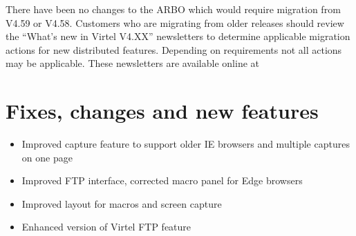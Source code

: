 \documentclass[letterpaper,10pt,english]{sphinxmanual}
\begin{document}

There have been no changes to the ARBO which would require migration from V4.59 or V4.58. Customers who are migrating from older releases should review the
“What’s new in Virtel V4.XX” newsletters to determine applicable migration actions for new distributed features.
Depending on requirements not all actions may be applicable. These newsletters are available online at 


\chapter{Fixes, changes and new features}
\label{\detokenize{Getting_Started:fixes-changes-and-new-features}}
\begin{itemize}
\item {} 
Improved capture feature to support older IE browsers and multiple captures on one page

\end{itemize}

\begin{itemize}
\item {} 
Improved FTP interface, corrected macro panel for Edge browsers

\end{itemize}

\begin{itemize}
\item {} 
Improved layout for macros and screen capture

\end{itemize}

\begin{itemize}
\item {} 
Enhanced version of Virtel FTP feature

\end{itemize}
\end{document}
